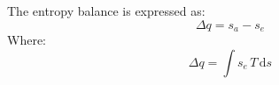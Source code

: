 The entropy balance is expressed as:  
\[
\Delta q = s_a - s_e
\]  
Where:  
\[
\Delta q = \int s_e \, T \, \text{d}s
\]